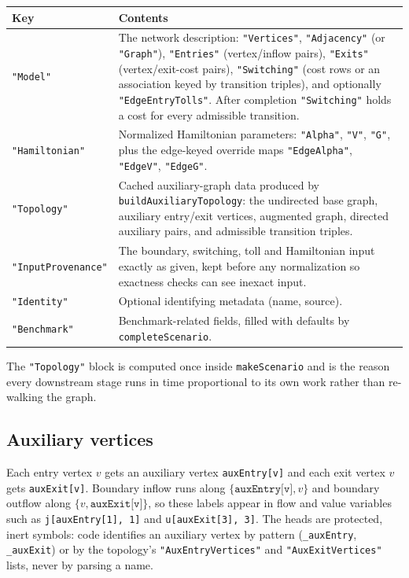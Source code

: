 \documentclass[11pt]{article}
\begin{document}
\begin{center}
\renewcommand{\arraystretch}{1.2}
\begin{longtable}{@{}p{3.6cm} p{10.9cm}@{}}
\toprule
\textbf{Key} & \textbf{Contents} \\
\midrule
\endhead
\texttt{"Model"} & The network description: \texttt{"Vertices"}, \texttt{"Adjacency"} (or \texttt{"Graph"}), \texttt{"Entries"} (vertex/inflow pairs), \texttt{"Exits"} (vertex/exit-cost pairs), \texttt{"Switching"} (cost rows or an association keyed by transition triples), and optionally \texttt{"EdgeEntryTolls"}. After completion \texttt{"Switching"} holds a cost for every admissible transition. \\
\texttt{"Hamiltonian"} & Normalized Hamiltonian parameters: \texttt{"Alpha"}, \texttt{"V"}, \texttt{"G"}, plus the edge-keyed override maps \texttt{"EdgeAlpha"}, \texttt{"EdgeV"}, \texttt{"EdgeG"}. \\
\texttt{"Topology"} & Cached auxiliary-graph data produced by \texttt{buildAuxiliaryTopology}: the undirected base graph, auxiliary entry/exit vertices, augmented graph, directed auxiliary pairs, and admissible transition triples. \\
\texttt{"InputProvenance"} & The boundary, switching, toll and Hamiltonian input exactly as given, kept before any normalization so exactness checks can see inexact input. \\
\texttt{"Identity"} & Optional identifying metadata (name, source). \\
\texttt{"Benchmark"} & Benchmark-related fields, filled with defaults by \texttt{completeScenario}. \\
\bottomrule
\end{longtable}
\end{center}

The \texttt{"Topology"} block is computed once inside \texttt{makeScenario} and is the reason every downstream stage runs in time proportional to its own work rather than re-walking the graph.

\subsection*{Auxiliary vertices}

Each entry vertex $v$ gets an auxiliary vertex \texttt{auxEntry[v]} and each exit vertex $v$ gets \texttt{auxExit[v]}. Boundary inflow runs along $\{\texttt{auxEntry[v]}, v\}$ and boundary outflow along $\{v, \texttt{auxExit[v]}\}$, so these labels appear in flow and value variables such as \texttt{j[auxEntry[1], 1]} and \texttt{u[auxExit[3], 3]}. The heads are protected, inert symbols: code identifies an auxiliary vertex by pattern (\texttt{\_auxEntry}, \texttt{\_auxExit}) or by the topology's \texttt{"AuxEntryVertices"} and \texttt{"AuxExitVertices"} lists, never by parsing a name.
\end{document}
